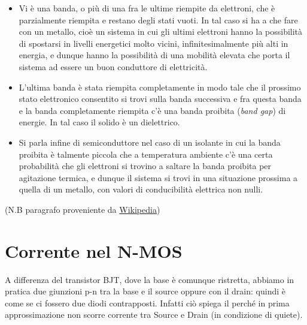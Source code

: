 \documentclass[
]{book}
\providecommand{\tightlist}{%
  \setlength{\itemsep}{0pt}\setlength{\parskip}{0pt}}
\begin{document}
\begin{itemize}
\tightlist
\item
  Vi è una banda, o più di una fra le ultime riempite da elettroni, che
  è parzialmente riempita e restano degli stati vuoti. In tal caso si ha
  a che fare con un metallo, cioè un sistema in cui gli ultimi elettroni
  hanno la possibilità di spostarsi in livelli energetici molto vicini,
  infinitesimalmente più alti in energia, e dunque hanno la possibilità
  di una mobilità elevata che porta il sistema ad essere un buon
  conduttore di elettricità.
\item
  L'ultima banda è stata riempita completamente in modo tale che il
  prossimo stato elettronico consentito si trovi sulla banda successiva
  e fra questa banda e la banda completamente riempita c'è una banda
  proibita (\emph{band gap}) di energie. In tal caso il solido è un
  dielettrico.
\item
  Si parla infine di semiconduttore nel caso di un isolante in cui la
  banda proibita è talmente piccola che a temperatura ambiente c'è una
  certa probabilità che gli elettroni si trovino a saltare la banda
  proibita per agitazione termica, e dunque il sistema si trovi in una
  situazione prossima a quella di un metallo, con valori di
  conducibilità elettrica non nulli.
\end{itemize}

(N.B paragrafo proveniente da
\href{https://it.wikipedia.org/wiki/Struttura_elettronica_a_bande}{Wikipedia})

\section{Corrente nel N-MOS}\label{corrente-nel-n-mos}

A differenza del transistor BJT, dove la base è comunque ristretta,
abbiamo in pratica due giunzioni p-n tra la base e il source oppure con
il drain: quindi è come se ci fossero due diodi contrapposti. Infatti
ciò spiega il perché in prima approssimazione non scorre corrente tra
Source e Drain (in condizione di quiete).
\end{document}
